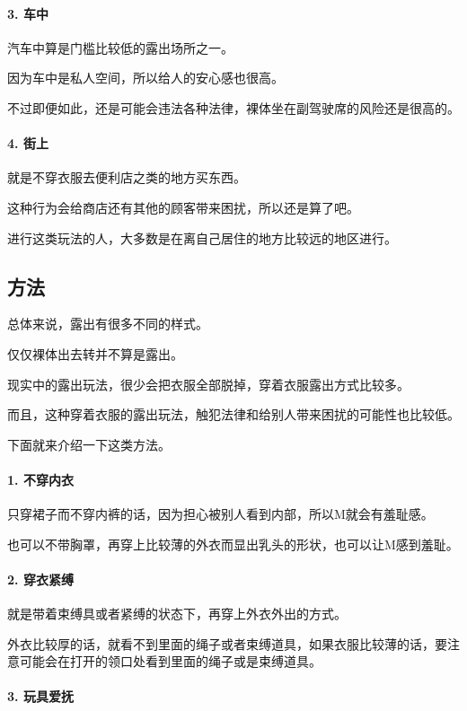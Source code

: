 \documentclass[12pt,UTF8]{ctexbook}
\begin{document}
\paragraph{3. 车中}

汽车中算是门槛比较低的露出场所之一。

因为车中是私人空间，所以给人的安心感也很高。

不过即便如此，还是可能会违法各种法律，裸体坐在副驾驶席的风险还是很高的。

\paragraph{4. 街上}

就是不穿衣服去便利店之类的地方买东西。

这种行为会给商店还有其他的顾客带来困扰，所以还是算了吧。

进行这类玩法的人，大多数是在离自己居住的地方比较远的地区进行。

\subsection{方法}

总体来说，露出有很多不同的样式。

仅仅裸体出去转并不算是露出。

现实中的露出玩法，很少会把衣服全部脱掉，穿着衣服露出方式比较多。

而且，这种穿着衣服的露出玩法，触犯法律和给别人带来困扰的可能性也比较低。

下面就来介绍一下这类方法。

\paragraph{1. 不穿内衣}

只穿裙子而不穿内裤的话，因为担心被别人看到内部，所以M就会有羞耻感。

也可以不带胸罩，再穿上比较薄的外衣而显出乳头的形状，也可以让M感到羞耻。

\paragraph{2. 穿衣紧缚}

就是带着束缚具或者紧缚的状态下，再穿上外衣外出的方式。

外衣比较厚的话，就看不到里面的绳子或者束缚道具，如果衣服比较薄的话，要注意可能会在打开的领口处看到里面的绳子或是束缚道具。

\paragraph{3. 玩具爱抚}
\end{document}
